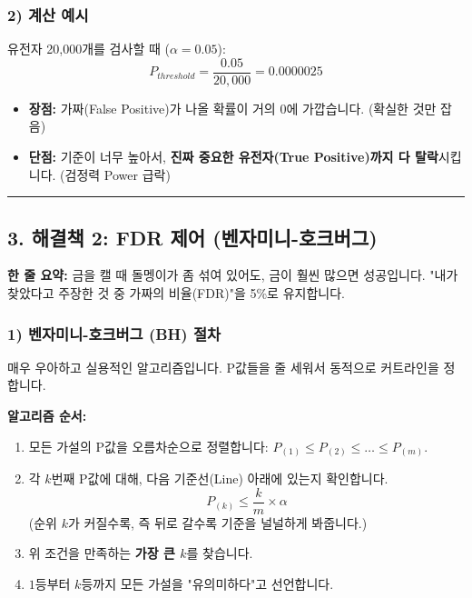 \documentclass[11pt,a4paper]{book}
\theoremstyle{definition}
\begin{document}
\subsubsection*{2) 계산 예시}
유전자 20,000개를 검사할 때 ($\alpha=0.05$):
$$ P_{threshold} = \frac{0.05}{20,000} = 0.0000025 $$
\begin{itemize}
    \item \textbf{장점:} 가짜(False Positive)가 나올 확률이 거의 0에 가깝습니다. (확실한 것만 잡음)
    \item \textbf{단점:} 기준이 너무 높아서, \textbf{진짜 중요한 유전자(True Positive)까지 다 탈락}시킵니다. (검정력 Power 급락)
\end{itemize}

\vspace{0.5cm}\hrule\vspace{0.5cm}

\subsection{3. 해결책 2: FDR 제어 (벤자미니-호크버그)}

\begin{conceptbox}[title={개념 3: 섞여도 괜찮아, 비율만 맞춰}]
\textbf{한 줄 요약:} 금을 캘 때 돌멩이가 좀 섞여 있어도, 금이 훨씬 많으면 성공입니다. "내가 찾았다고 주장한 것 중 가짜의 비율(FDR)"을 5\%로 유지합니다.
\end{conceptbox}

\subsubsection*{1) 벤자미니-호크버그 (BH) 절차}
매우 우아하고 실용적인 알고리즘입니다. P값들을 줄 세워서 동적으로 커트라인을 정합니다.

\textbf{알고리즘 순서:}
\begin{enumerate}
    \item 모든 가설의 P값을 오름차순으로 정렬합니다: $P_{(1)} \le P_{(2)} \le \dots \le P_{(m)}$.
    \item 각 $k$번째 P값에 대해, 다음 기준선(Line) 아래에 있는지 확인합니다.
    $$ P_{(k)} \le \frac{k}{m} \times \alpha $$
    (순위 $k$가 커질수록, 즉 뒤로 갈수록 기준을 널널하게 봐줍니다.)
    \item 위 조건을 만족하는 \textbf{가장 큰 $k$}를 찾습니다.
    \item $1$등부터 $k$등까지 모든 가설을 "유의미하다"고 선언합니다.
\end{enumerate}
\end{document}
